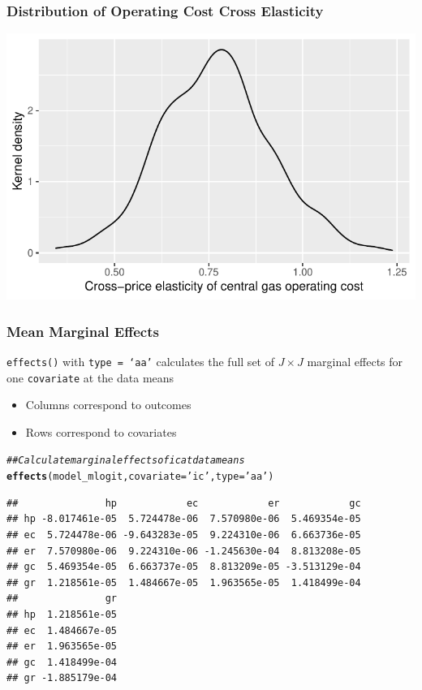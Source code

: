 \documentclass{beamer}\usepackage[]{graphicx}\usepackage[]{xcolor}
\makeatletter
\def\maxwidth{ %
  \ifdim\Gin@nat@width>\linewidth
    \linewidth
  \else
    \Gin@nat@width
  \fi
}
\newcommand{\hlstr}[1]{\textcolor[rgb]{0.192,0.494,0.8}{#1}}%
\newcommand{\hlcom}[1]{\textcolor[rgb]{0.678,0.584,0.686}{\textit{#1}}}%
\newcommand{\hlstd}[1]{\textcolor[rgb]{0.345,0.345,0.345}{#1}}%
\newcommand{\hlkwc}[1]{\textcolor[rgb]{0.333,0.667,0.333}{#1}}%
\newcommand{\hlkwd}[1]{\textcolor[rgb]{0.737,0.353,0.396}{\textbf{#1}}}%
\newenvironment{kframe}{%
 \def\at@end@of@kframe{}%
 \ifinner\ifhmode%
  \def\at@end@of@kframe{\end{minipage}}%
  \begin{minipage}{\columnwidth}%
 \fi\fi%
 \def\FrameCommand##1{\hskip\@totalleftmargin \hskip-\fboxsep
 \colorbox{shadecolor}{##1}\hskip-\fboxsep
     \hskip-\linewidth \hskip-\@totalleftmargin \hskip\columnwidth}%
 \MakeFramed {\advance\hsize-\width
   \@totalleftmargin\z@ \linewidth\hsize
   \@setminipage}}%
 {\par\unskip\endMakeFramed%
 \at@end@of@kframe}
\newenvironment{knitrout}{}{} %
\makeatother
\begin{document}
\begin{frame}[fragile]\frametitle{Distribution of Operating Cost Cross Elasticity}
\begin{knitrout}\footnotesize
{}\color{fgcolor}

{\centering \includegraphics[width=\maxwidth]{figure/unnamed-chunk-60-1} 

}


\end{knitrout}
\end{frame}

\begin{frame}[fragile]\frametitle{Mean Marginal Effects}
	  \texttt{effects()} with \texttt{type = `aa'} calculates the full set of $J \times J$ marginal effects for one \texttt{covariate} at the data means
	  \begin{itemize}
        \item Columns correspond to outcomes
        \item Rows correspond to covariates
    \end{itemize}
\begin{knitrout}\footnotesize
{}\color{fgcolor}\begin{kframe}
\begin{alltt}
\hlcom{## Calculate marginal effects of ic at data means}
\hlkwd{effects}\hlstd{(model_mlogit,} \hlkwc{covariate} \hlstd{=} \hlstr{'ic'}\hlstd{,} \hlkwc{type} \hlstd{=} \hlstr{'aa'}\hlstd{)}
\end{alltt}
\begin{verbatim}
##               hp            ec            er            gc
## hp -8.017461e-05  5.724478e-06  7.570980e-06  5.469354e-05
## ec  5.724478e-06 -9.643283e-05  9.224310e-06  6.663736e-05
## er  7.570980e-06  9.224310e-06 -1.245630e-04  8.813208e-05
## gc  5.469354e-05  6.663737e-05  8.813209e-05 -3.513129e-04
## gr  1.218561e-05  1.484667e-05  1.963565e-05  1.418499e-04
##               gr
## hp  1.218561e-05
## ec  1.484667e-05
## er  1.963565e-05
## gc  1.418499e-04
## gr -1.885179e-04
\end{verbatim}
\end{kframe}
\end{knitrout}
\end{frame}
\end{document}
